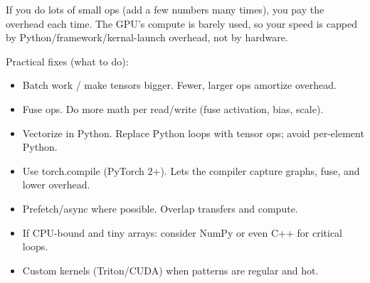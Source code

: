 If you do lots of small ops (\eg add a few numbers many times), you pay the overhead each time. The GPU's compute is barely used, so your speed is capped by Python/framework/kernal-launch overhead, not by hardware.


Practical fixes (what to do):
\begin{itemize}
	\item Batch work / make tensors bigger. Fewer, larger ops amortize overhead.
	\item Fuse ops. Do more math per read/write (\eg fuse activation, bias, scale).
	\item Vectorize in Python. Replace Python loops with tensor ops; avoid per-element Python.
	\item Use torch.compile (PyTorch 2+). Lets the compiler capture graphs, fuse, and lower overhead.
	\item Prefetch/async where possible. Overlap transfers and compute.
	\item If CPU-bound and tiny arrays: consider NumPy or even C++ for critical loops.
	\item Custom kernels (\eg Triton/CUDA) when patterns are regular and hot.
\end{itemize}


